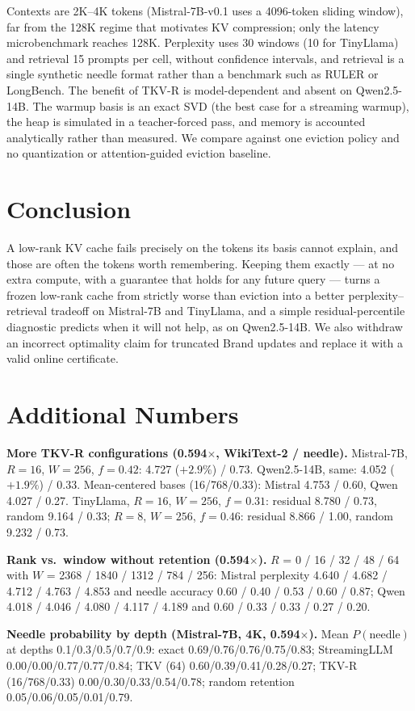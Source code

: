 \documentclass{article}
\begin{document}
Contexts are 2K--4K tokens (Mistral-7B-v0.1 uses a 4096-token sliding window),
far from the 128K regime that motivates KV compression; only the latency
microbenchmark reaches 128K. Perplexity uses 30 windows (10 for TinyLlama) and
retrieval 15 prompts per cell, without confidence intervals, and retrieval is a
single synthetic needle format rather than a benchmark such as RULER or
LongBench. The benefit of TKV-R is model-dependent and absent on
Qwen2.5-14B. The warmup basis is an exact SVD (the best case for a streaming
warmup), the heap is simulated in a teacher-forced pass, and memory is
accounted analytically rather than measured. We compare against one eviction
policy and no quantization or attention-guided eviction baseline.

\section{Conclusion}

A low-rank KV cache fails precisely on the tokens its basis cannot explain,
and those are often the tokens worth remembering. Keeping them exactly --- at
no extra compute, with a guarantee that holds for any future query --- turns a
frozen low-rank cache from strictly worse than eviction into a better
perplexity--retrieval tradeoff on Mistral-7B and TinyLlama, and a simple
residual-percentile diagnostic predicts when it will not help, as on
Qwen2.5-14B. We also withdraw an incorrect optimality claim for truncated
Brand updates and replace it with a valid online certificate.

\small



\appendix
\section{Additional Numbers}
\label{app:numbers}

\textbf{More TKV-R configurations (0.594$\times$, WikiText-2 / needle).}
Mistral-7B, $R{=}16$, $W{=}256$, $f{=}0.42$: 4.727 ($+2.9\%$) / 0.73. Qwen2.5-14B,
same: 4.052 ($+1.9\%$) / 0.33. Mean-centered bases (16/768/0.33): Mistral 4.753
/ 0.60, Qwen 4.027 / 0.27. TinyLlama, $R{=}16$, $W{=}256$, $f{=}0.31$: residual
8.780 / 0.73, random 9.164 / 0.33; $R{=}8$, $W{=}256$, $f{=}0.46$: residual
8.866 / 1.00, random 9.232 / 0.73.

\textbf{Rank vs.\ window without retention (0.594$\times$).} $R$ = 0 / 16 / 32
/ 48 / 64 with $W$ = 2368 / 1840 / 1312 / 784 / 256: Mistral perplexity 4.640 /
4.682 / 4.712 / 4.763 / 4.853 and needle accuracy 0.60 / 0.40 / 0.53 / 0.60 /
0.87; Qwen 4.018 / 4.046 / 4.080 / 4.117 / 4.189 and 0.60 / 0.33 / 0.33 / 0.27 /
0.20.

\textbf{Needle probability by depth (Mistral-7B, 4K, 0.594$\times$).} Mean
$P(\text{needle})$ at depths 0.1/0.3/0.5/0.7/0.9: exact 0.69/0.76/0.76/0.75/0.83;
StreamingLLM 0.00/0.00/0.77/0.77/0.84; TKV (64) 0.60/0.39/0.41/0.28/0.27; TKV-R
(16/768/0.33) 0.00/0.30/0.33/0.54/0.78; random retention
0.05/0.06/0.05/0.01/0.79.
\end{document}
